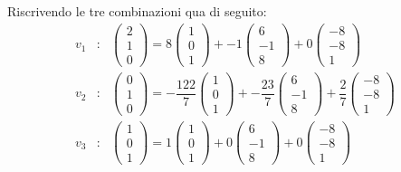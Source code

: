 \documentclass[a4paper]{article}
\begin{document}
	\noindent
	Riscrivendo le tre combinazioni qua di seguito:
	\begin{equation*}
		\begin{array}{lll}
			v_{1} &:& \begin{pmatrix}
				2 \\ 1 \\ 0
			\end{pmatrix} =
			8 \begin{pmatrix}
				1 \\ 0 \\ 1
			\end{pmatrix} +
			-1 \begin{pmatrix}
				6 \\ -1 \\ 8
			\end{pmatrix} +
			0 \begin{pmatrix}
				-8 \\ -8 \\ 1
			\end{pmatrix} \\ [1.8em]
			v_{2} &:& \begin{pmatrix}
				0 \\ 1 \\ 0
			\end{pmatrix} =
			-\dfrac{122}{7} \begin{pmatrix}
				1 \\ 0 \\ 1
			\end{pmatrix} +
			-\dfrac{23}{7} \begin{pmatrix}
				6 \\ -1 \\ 8
			\end{pmatrix} +
			\dfrac{2}{7} \begin{pmatrix}
				-8 \\ -8 \\ 1
			\end{pmatrix} \\ [1.8em]
			v_{3} &:& \begin{pmatrix}
				1 \\ 0 \\ 1
			\end{pmatrix} =
			1 \begin{pmatrix}
				1 \\ 0 \\ 1
			\end{pmatrix} +
			0 \begin{pmatrix}
				6 \\ -1 \\ 8
			\end{pmatrix} +
			0 \begin{pmatrix}
				-8 \\ -8 \\ 1
			\end{pmatrix}
		\end{array}
	\end{equation*}
\end{document}
